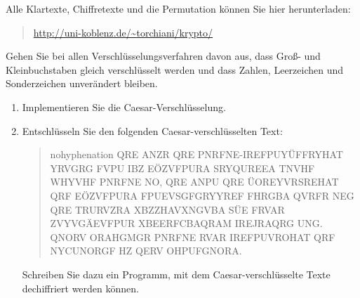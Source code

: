 \documentclass[german]{mhexsheet}
\begin{document}
\maketitle
Alle Klartexte, Chiffretexte und die Permutation können Sie hier herunterladen: 
\begin{quote}
\url{http://uni-koblenz.de/~torchiani/krypto/} 
\end{quote}
Gehen Sie bei allen Verschlüsselungsverfahren davon aus, dass Groß- und Kleinbuchstaben gleich verschlüsselt werden und dass Zahlen, Leerzeichen und Sonderzeichen unverändert bleiben.


\begin{exercise}[title=Caesar-Verschlüsselung]
 \begin{enumerate}
  \item Implementieren Sie die Caesar-Verschlüsselung.
  \item Entschlüsseln Sie den folgenden Caesar-verschlüsselten Text:
  
  \begin{quote}\small\begin{sloppypar}\begin{hyphenrules}{nohyphenation}
  \textsf{QRE ANZR QRE PNRFNE-IREFPUYÜFFRYHAT YRVGRG FVPU IBZ EÖZVFPURA SRYQUREEA TNVHF WHYVHF PNRFNE NO, QRE ANPU QRE ÜOREYVRSREHAT QRF EÖZVFPURA FPUEVSGFGRYYREF FHRGBA QVRFR NEG QRE TRURVZRA XBZZHAVXNGVBA SÜE FRVAR ZVYVGÄEVFPUR XBEERFCBAQRAM IREJRAQRG UNG. QNORV ORAHGMGR PNRFNE RVAR IREFPUVROHAT QRF NYCUNORGF HZ QERV OHPUFGNORA.}
  \end{hyphenrules}
  \end{sloppypar}
  \end{quote}
 
  Schreiben Sie dazu ein Programm, mit dem Caesar-verschlüsselte Texte dechiffriert werden können.
 \end{enumerate}
\end{exercise}
\end{document}
